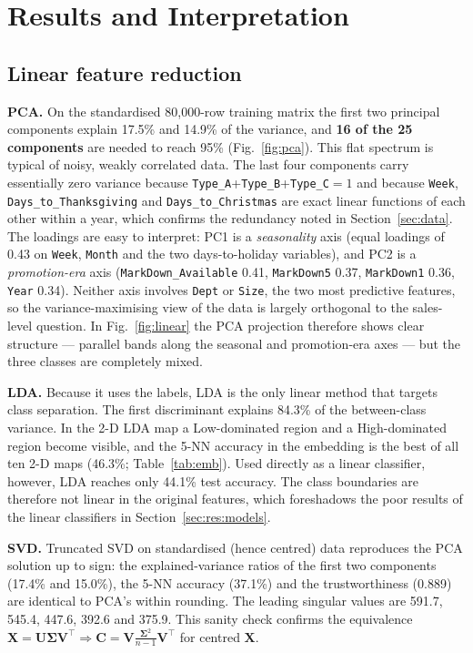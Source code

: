 \section{Results and Interpretation}\label{sec:results}

\subsection{Linear feature reduction}
\textbf{PCA.} On the standardised 80{,}000-row training matrix the first two principal components explain 17.5\% and 14.9\% of the variance, and \textbf{16 of the 25 components} are needed to reach 95\% (Fig.~\ref{fig:pca}). This flat spectrum is typical of noisy, weakly correlated data. The last four components carry essentially zero variance because \texttt{Type\_A}+\texttt{Type\_B}+\texttt{Type\_C}$=1$ and because \texttt{Week}, \texttt{Days\_to\_Thanksgiving} and \texttt{Days\_to\_Christmas} are exact linear functions of each other within a year, which confirms the redundancy noted in Section~\ref{sec:data}. The loadings are easy to interpret: PC1 is a \emph{seasonality} axis (equal loadings of 0.43 on \texttt{Week}, \texttt{Month} and the two days-to-holiday variables), and PC2 is a \emph{promotion-era} axis (\texttt{MarkDown\_Available} 0.41, \texttt{MarkDown5} 0.37, \texttt{MarkDown1} 0.36, \texttt{Year} 0.34). Neither axis involves \texttt{Dept} or \texttt{Size}, the two most predictive features, so the variance-maximising view of the data is largely orthogonal to the sales-level question. In Fig.~\ref{fig:linear} the PCA projection therefore shows clear structure --- parallel bands along the seasonal and promotion-era axes --- but the three classes are completely mixed.

\textbf{LDA.} Because it uses the labels, LDA is the only linear method that targets class separation. The first discriminant explains 84.3\% of the between-class variance. In the 2-D LDA map a Low-dominated region and a High-dominated region become visible, and the 5-NN accuracy in the embedding is the best of all ten 2-D maps (46.3\%; Table~\ref{tab:emb}). Used directly as a linear classifier, however, LDA reaches only 44.1\% test accuracy. The class boundaries are therefore not linear in the original features, which foreshadows the poor results of the linear classifiers in Section~\ref{sec:res:models}.

\textbf{SVD.} Truncated SVD on standardised (hence centred) data reproduces the PCA solution up to sign: the explained-variance ratios of the first two components (17.4\% and 15.0\%), the 5-NN accuracy (37.1\%) and the trustworthiness (0.889) are identical to PCA's within rounding. The leading singular values are 591.7, 545.4, 447.6, 392.6 and 375.9. This sanity check confirms the equivalence $\mathbf{X}=\mathbf{U}\boldsymbol{\Sigma}\mathbf{V}^\top\Rightarrow\mathbf{C}=\mathbf{V}\frac{\boldsymbol{\Sigma}^2}{n-1}\mathbf{V}^\top$ for centred $\mathbf{X}$.

